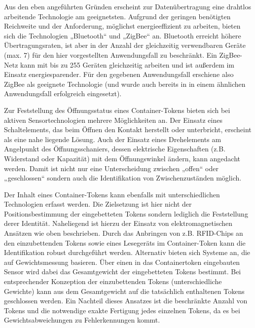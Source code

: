 Aus den eben angeführten Gründen erscheint zur Datenübertragung eine drahtlos arbeitende Technologie am geeignetsten. Aufgrund der geringen benötigten Reichweite und der Anforderung, möglichst energieeffizient zu arbeiten, bieten sich die Technologien „Bluetooth“ \citep{Bluetooth-SIG07} und „ZigBee“ \citep{ZigBee07} an. Bluetooth erreicht höhere Übertragungsraten, ist aber in der Anzahl der gleichzeitig verwendbaren Geräte (max. 7) für den hier vorgestellten Anwendungsfall zu beschränkt. Ein ZigBee-Netz kann mit bis zu 255 Geräten gleichzeitig arbeiten und ist außerdem im Einsatz energiesparender. Für den gegebenen Anwendungsfall erschiene also ZigBee als geeignete Technologie (und wurde auch bereits in \citep{Ferscha08} in einem ähnlichen Anwendungsfall erfolgreich eingesetzt).

Zur Feststellung des Öffnungsstatus eines Container-Tokens bieten sich bei aktiven Sensortechnologien mehrere Möglichkeiten an. Der Einsatz eines Schaltelements, das beim Öffnen den Kontakt herstellt oder unterbricht, erscheint als eine nahe liegende Lösung. Auch der Einsatz eines Drehelements am Angelpunkt des Öffnungsschaniers, dessen elektrische Eigenschaften (z.B. Widerstand oder Kapazität) mit dem Öffnungswinkel ändern, kann angedacht werden. Damit ist nicht nur eine Unterscheidung zwischen „offen“ oder „geschlossen“ sondern auch die Identifikation von Zwischenzuständen möglich.

Der Inhalt eines Container-Tokens kann ebenfalls mit unterschiedlichen Technologien erfasst werden. Die Zielsetzung ist hier nicht der Positionsbestimmung der eingebetteten Tokens sondern lediglich die Feststellung derer Identität. Naheliegend ist hierzu der Einsatz von elektromagnetischen Ansätzen wie oben beschrieben. Durch das Anbringen von z.B. RFID-Chips an den einzubettenden Tokens sowie eines Lesegeräts im Container-Token kann die Identifikation robust durchgeführt werden. Alternativ bieten sich Systeme an, die auf Gewichtsmessung basieren. Über einen in das Containertoken eingebauten Sensor wird dabei das Gesamtgewicht der eingebetteten Tokens bestimmt. Bei entsprechender Konzeption der einzubettenden Tokens (unterschiedliche Gewichte) kann aus dem Gesamtgewicht auf die tatsächlich enthaltenen Tokens geschlossen werden. Ein Nachteil dieses Ansatzes ist die beschränkte Anzahl von Tokens und die notwendige exakte Fertigung jedes einzelnen Tokens, da es bei Gewichtsabweichungen zu Fehlerkennungen kommt.


